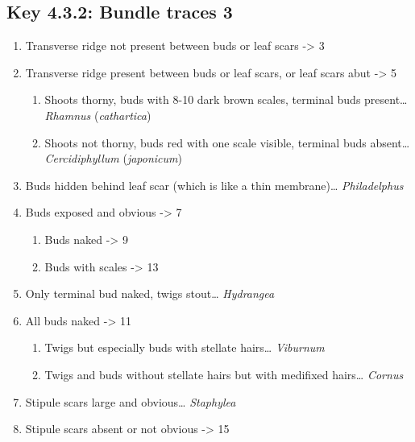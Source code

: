 \documentclass[openany]{book}
\providecommand{\tightlist}{%
  \setlength{\itemsep}{0pt}\setlength{\parskip}{0pt}}
\begin{document}
\hypertarget{key-4.3.2-bundle-traces-3}{%
\subsection*{Key 4.3.2: Bundle traces 3}\label{key-4.3.2-bundle-traces-3}}

\begin{enumerate}
\def\labelenumi{\arabic{enumi}.}
\tightlist
\item
  Transverse ridge not present between buds or leaf scars -\textgreater{} 3
\item
  Transverse ridge present between buds or leaf scars, or leaf scars abut -\textgreater{} 5

  \begin{enumerate}
  \def\labelenumii{\arabic{enumii}.}
  \setcounter{enumii}{2}
  \tightlist
  \item
    Shoots thorny, buds with 8-10 dark brown scales, terminal buds present\ldots{} \emph{Rhamnus} (\emph{cathartica})
  \item
    Shoots not thorny, buds red with one scale visible, terminal buds absent\ldots{} \emph{Cercidiphyllum} (\emph{japonicum})
  \end{enumerate}
\item
  Buds hidden behind leaf scar (which is like a thin membrane)\ldots{} \emph{Philadelphus}
\item
  Buds exposed and obvious -\textgreater{} 7

  \begin{enumerate}
  \def\labelenumii{\arabic{enumii}.}
  \setcounter{enumii}{6}
  \tightlist
  \item
    Buds naked -\textgreater{} 9
  \item
    Buds with scales -\textgreater{} 13
  \end{enumerate}
\item
  Only terminal bud naked, twigs stout\ldots{} \emph{Hydrangea}
\item
  All buds naked -\textgreater{} 11

  \begin{enumerate}
  \def\labelenumii{\arabic{enumii}.}
  \setcounter{enumii}{10}
  \tightlist
  \item
    Twigs but especially buds with stellate hairs\ldots{} \emph{Viburnum}
  \item
    Twigs and buds without stellate hairs but with medifixed hairs\ldots{} \emph{Cornus}
  \end{enumerate}
\item
  Stipule scars large and obvious\ldots{} \emph{Staphylea}
\item
  Stipule scars absent or not obvious -\textgreater{} 15


\end{enumerate}
\end{document}

